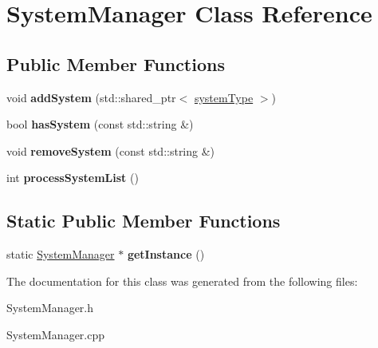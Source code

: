 \hypertarget{class_system_manager}{\section{System\-Manager Class Reference}
\label{d6/d8f/class_system_manager}
}
\subsection*{Public Member Functions}
\begin{DoxyCompactItemize}
\item 
\hypertarget{class_system_manager_a65a803bea95eaeb3bebab00aecf46f22}{void {\bfseries add\-System} (std\-::shared\-\_\-ptr$<$ \hyperlink{_abstract_system_8h_a1411f3bb7eaf6ed11af20ec634ed4a5e}{system\-Type} $>$)}\label{d6/d8f/class_system_manager_a65a803bea95eaeb3bebab00aecf46f22}

\item 
\hypertarget{class_system_manager_af9be767096c20e7c9c5352743c6c25ec}{bool {\bfseries has\-System} (const std\-::string \&)}\label{d6/d8f/class_system_manager_af9be767096c20e7c9c5352743c6c25ec}

\item 
\hypertarget{class_system_manager_af36ad014cbc78142d48ca5a27646a8d7}{void {\bfseries remove\-System} (const std\-::string \&)}\label{d6/d8f/class_system_manager_af36ad014cbc78142d48ca5a27646a8d7}

\item 
\hypertarget{class_system_manager_a239491cad9990ede93d3bad25b381602}{int {\bfseries process\-System\-List} ()}\label{d6/d8f/class_system_manager_a239491cad9990ede93d3bad25b381602}

\end{DoxyCompactItemize}
\subsection*{Static Public Member Functions}
\begin{DoxyCompactItemize}
\item 
\hypertarget{class_system_manager_a3cdbd045de051482a9b2342fc858e9bf}{static \hyperlink{class_system_manager}{System\-Manager} $\ast$ {\bfseries get\-Instance} ()}\label{d6/d8f/class_system_manager_a3cdbd045de051482a9b2342fc858e9bf}

\end{DoxyCompactItemize}


The documentation for this class was generated from the following files\-:\begin{DoxyCompactItemize}
\item 
System\-Manager.\-h\item 
System\-Manager.\-cpp\end{DoxyCompactItemize}
